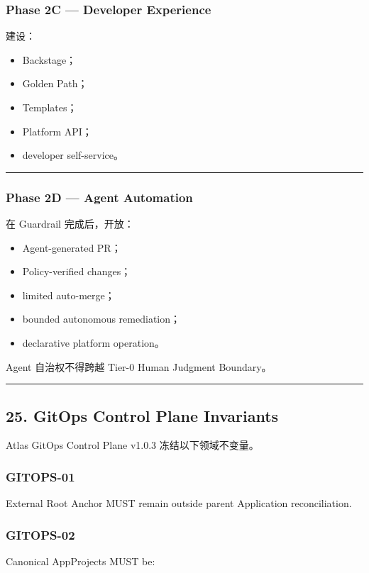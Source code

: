 \documentclass[11pt,a4paper]{article}
\begin{document}
\subsubsection{Phase 2C — Developer Experience}
建设：

\begin{itemize}
  \item Backstage；
  \item Golden Path；
  \item Templates；
  \item Platform API；
  \item developer self-service。
\end{itemize}
\vspace{0.5em}\hrule\vspace{0.5em}
\subsubsection{Phase 2D — Agent Automation}
在 Guardrail 完成后，开放：

\begin{itemize}
  \item Agent-generated PR；
  \item Policy-verified changes；
  \item limited auto-merge；
  \item bounded autonomous remediation；
  \item declarative platform operation。
\end{itemize}
Agent 自治权不得跨越 Tier-0 Human Judgment Boundary。

\vspace{0.5em}\hrule\vspace{0.5em}
\subsection{25. GitOps Control Plane Invariants}
Atlas GitOps Control Plane v1.0.3 冻结以下领域不变量。

\subsubsection{GITOPS-01}
External Root Anchor MUST remain outside parent Application reconciliation.

\subsubsection{GITOPS-02}
Canonical AppProjects MUST be:
\end{document}
